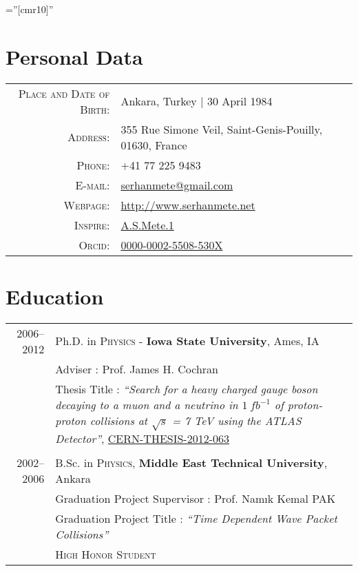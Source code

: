 \documentclass[a4paper,10pt]{article}
\begin{document}
\pagestyle{empty} %

\font\fb=''[cmr10]'' %

\par{\par}

\section{Personal Data}

\begin{tabular}{rl}
    \textsc{Place and Date of Birth:} 			& Ankara, Turkey  | 30 April 1984 							\\
    \textsc{Address:}   					& 355 Rue Simone Veil, Saint-Genis-Pouilly, 01630, France		\\
    \textsc{Phone:}     						& +41 77 225 9483										\\
    \textsc{E-mail:}     						& \href{mailto:serhanmete@gmail.com}{serhanmete@gmail.com}	\\
    \textsc{Webpage:}						& \href{http://www.serhanmete.net}{http://www.serhanmete.net} 	\\
    \textsc{Inspire:}						& \href{https://inspirehep.net/author/profile/A.S.Mete.1}{A.S.Mete.1}  \\
    \textsc{Orcid:}						& \href{https://orcid.org/0000-0002-5508-530X}{0000-0002-5508-530X}
\end{tabular}

\vspace{-1mm}
\section{Education}

\begin{tabular}{r | p{15.5cm}}
\textsc{2006--2012}				&  Ph.D. in \textsc{Physics} - \textbf{Iowa State University}, Ames, IA \\ 
							& Adviser\phantom{Ttle} : Prof. James H. Cochran 				\\
							& Thesis Title : {\it``Search for a heavy charged gauge boson decaying to a 
							    muon and a neutrino in $1\ fb^{-1}$ of proton-proton collisions 
							    at $\sqrt{s}$ = 7 TeV using the ATLAS Detector''}, \href{http://cds.cern.ch/record/1454661}{CERN-THESIS-2012-063}  \\	
\multicolumn{2}{c}{} \\
\textsc{2002--2006} 				& B.Sc. in \textsc{Physics}, \textbf{Middle East Technical University}, Ankara				\\
							& Graduation Project Supervisor : Prof. Nam{\i}k Kemal \textsc{PAK}						\\
							& Graduation Project Title \phantom{rvsor} : \it{``Time Dependent Wave Packet Collisions''} 	\\
							& \normalsize \textsc{High Honor Student}											\\
\end{tabular}
\end{document}
